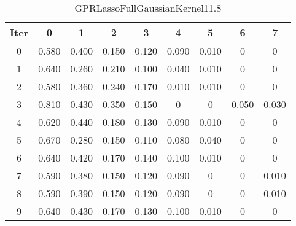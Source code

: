 \begin{table}
	\begin{center}
		\begin{tabular}{|c|c|c|c|c|c|c|c|c|}
			\hline
			Iter & 0 & 1 & 2 & 3 & 4 & 5 & 6 & 7 \\
			\hline
			0 & 0.580 & 0.400 & 0.150 & 0.120 & 0.090 & 0.010 & 0 & 0 \\
			\hline
			1 & 0.640 & 0.260 & 0.210 & 0.100 & 0.040 & 0.010 & 0 & 0 \\
			\hline
			2 & 0.580 & 0.360 & 0.240 & 0.170 & 0.010 & 0.010 & 0 & 0 \\
			\hline
			3 & 0.810 & 0.430 & 0.350 & 0.150 & 0 & 0 & 0.050 & 0.030 \\
			\hline
			4 & 0.620 & 0.440 & 0.180 & 0.130 & 0.090 & 0.010 & 0 & 0 \\
			\hline
			5 & 0.670 & 0.280 & 0.150 & 0.110 & 0.080 & 0.040 & 0 & 0 \\
			\hline
			6 & 0.640 & 0.420 & 0.170 & 0.140 & 0.100 & 0.010 & 0 & 0 \\
			\hline
			7 & 0.590 & 0.380 & 0.150 & 0.120 & 0.090 & 0 & 0 & 0.010 \\
			\hline
			8 & 0.590 & 0.390 & 0.150 & 0.120 & 0.090 & 0 & 0 & 0.010 \\
			\hline
			9 & 0.640 & 0.430 & 0.170 & 0.130 & 0.100 & 0.010 & 0 & 0 \\
			\hline
		\end{tabular}
	\end{center}
	\caption{GPRLassoFullGaussianKernel11.8}
\end{table}